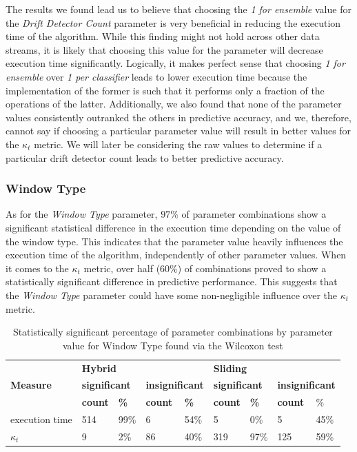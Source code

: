The results we found lead us to believe that choosing the \textit{1 for ensemble} value for the \textit{Drift Detector Count} parameter is very beneficial in reducing the execution time of the algorithm. While this finding might not hold across other data streams, it is likely that choosing this value for the parameter will decrease execution time significantly. Logically, it makes perfect sense that choosing \textit{1 for ensemble} over \textit{1 per classifier} leads to lower execution time because the implementation of the former is such that it performs only a fraction of the operations of the latter. Additionally, we also found that none of the parameter values consistently outranked the others in predictive accuracy, and we, therefore, cannot say if choosing a particular parameter value will result in better values for the $\kappa_t$ metric. We will later be considering the raw values to determine if a particular drift detector count leads to better predictive accuracy.

\subsubsection{Window Type}
As for the \textit{Window Type} parameter, $97\%$ of parameter combinations show a significant statistical difference in the execution time depending on the value of the window type. This indicates that the parameter value heavily influences the execution time of the algorithm, independently of other parameter values. When it comes to the $\kappa_t$ metric, over half (60\%) of combinations proved to show a statistically significant difference in predictive performance. This suggests that the \textit{Window Type} parameter could have some non-negligible influence over the $\kappa_t$ metric.

\begin{table}[]
\centering
\caption{\label{table:wilcoxon_window_type}Statistically significant percentage of parameter combinations by parameter value for Window Type found via the Wilcoxon test}
\begin{tabular}{|l|l|l|l|l|l|l|l|l|}
\hline
\multirow{3}{*}{\textbf{Measure}} & \multicolumn{4}{l|}{\textbf{Hybrid}} & \multicolumn{4}{l|}{\textbf{Sliding}} \\ \cline{2-9} 
 & \multicolumn{2}{l|}{\textbf{significant}} & \multicolumn{2}{l|}{\textbf{insignificant}} & \multicolumn{2}{l|}{\textbf{significant}} & \multicolumn{2}{l|}{\textbf{insignificant}} \\ \cline{2-9} 
 & \textbf{count} & \textbf{\%} & \textbf{count} & \textbf{\%} & \textbf{count} & \textbf{\%} & \textbf{count} & \% \\ \hline \hhline{=========}
execution time & 514 & 99\% & 6 & 54\% & 5 & 0\% & 5 & 45\% \\ \hline
$\kappa_t$ & 9 & 2\% & 86 & 40\% & 319 & 97\% & 125 & 59\% \\ \hline
\end{tabular}
\end{table}


